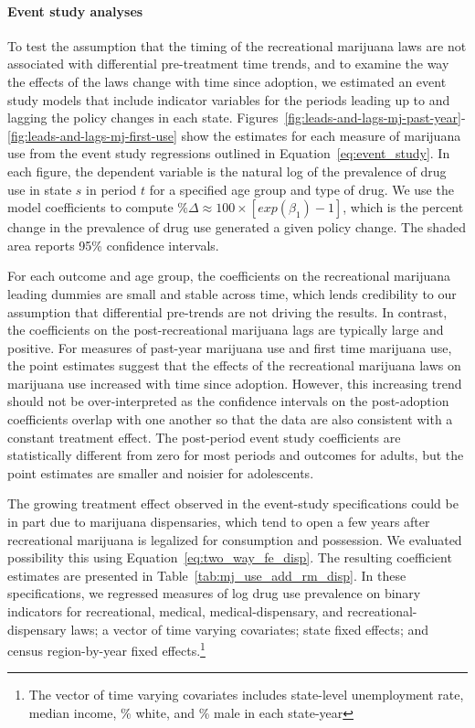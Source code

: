 \documentclass[12pt]{article}%
\begin{document}
\paragraph{Event study analyses}
To test the assumption that the timing of the recreational marijuana laws are not associated with differential pre-treatment time trends, and to examine the way the effects of the laws change with time since adoption, we estimated an event study models that include indicator variables for the periods leading up to and lagging the policy changes in each state. Figures~\ref{fig:leads-and-lags-mj-past-year}-\ref{fig:leads-and-lags-mj-first-use} show the estimates for each measure of marijuana use from the event study regressions outlined in Equation~\ref{eq:event_study}. In each figure, the dependent variable is the natural log of the prevalence of drug use in state $s$ in period $t$ for a specified age group and type of drug. 
We use the model coefficients to compute $\% \Delta \approx 100\times \left[exp(\beta_1)-1\right]$, which is the percent change in the prevalence of drug use generated a given policy change.  
The shaded area reports 95\% confidence intervals. 

For each outcome and age group, the coefficients on the recreational marijuana leading dummies are small and stable across time, which lends credibility to our assumption that differential pre-trends are not driving the results. In contrast, the coefficients on the post-recreational marijuana lags are typically large and positive. For measures of past-year marijuana use and first time marijuana use, the point estimates suggest that the effects of the recreational marijuana laws on marijuana use increased with time since adoption. However,  this increasing trend should not be over-interpreted as the confidence intervals on the post-adoption coefficients overlap with one another so that the data are also consistent with a constant treatment effect. The post-period event study coefficients are statistically different from zero for most periods and outcomes for adults, but the point estimates are smaller and noisier for adolescents. 

The growing treatment effect observed in the event-study specifications could be in part due to marijuana dispensaries, which tend to open a few years after recreational marijuana is legalized for consumption and possession. We evaluated possibility this using Equation~\ref{eq:two_way_fe_disp}. The resulting coefficient estimates are presented in Table~\ref{tab:mj_use_add_rm_disp}. In these specifications, we regressed measures of log drug use prevalence on binary indicators for recreational, medical, medical-dispensary, and recreational-dispensary laws; a vector of time varying covariates; state fixed effects; and census region-by-year fixed effects.\footnote{The vector of time varying covariates includes state-level unemployment rate, median income, \% white, and \% male in each state-year} 
\end{document}
